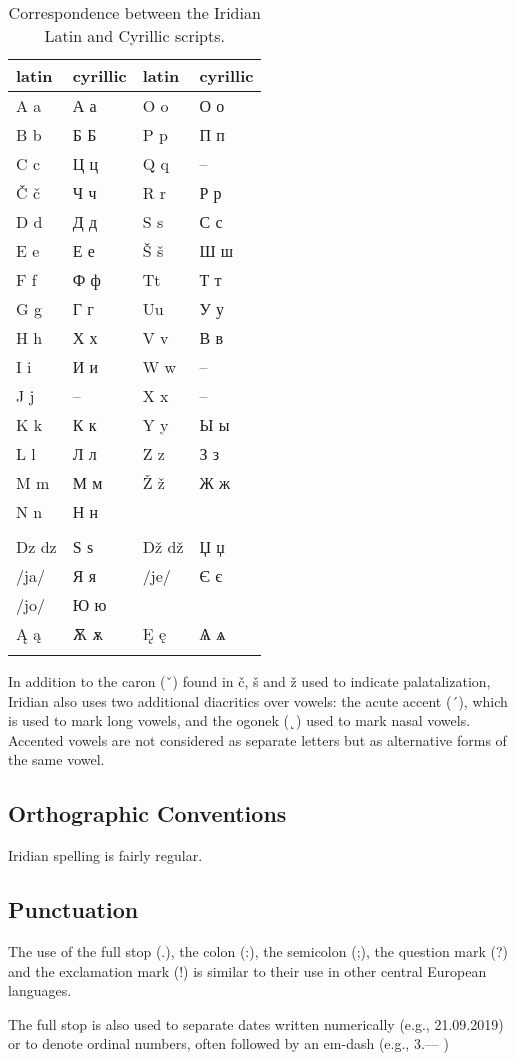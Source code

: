 \begin{table}[h]
	\small
 	\caption{Correspondence between the Iridian Latin and Cyrillic scripts.}
	\medskip
	\begin{tabu}to 0.8 \textwidth {YYYY}
		\toprule
		{{\sc  latin}} & {\sc cyrillic} & {{\sc  latin}} & {\sc cyrillic} \\
		\midrule\addlinespace
		A a 		& А а	& O o   & О о \\ 
		B b			& Б Б 	& P p 	& П п \\
		C c 		& Ц ц 	& Q q 	& -- \\
		Č č 		& Ч ч 	& R r 	& Р р \\
		D d 		& Д д	& S s 	& С с \\
		E e 		& Е е 	& Š š 	& Ш ш \\
		F f			& Ф ф	& Tt 	& Т т \\
		G g 		& Г г	& Uu	& У у \\
		H h			& Х х	& V v   & В в\\
		I i			& И и	& W w   & --\\
		J j			& --	& X x   & --\\
		K k			& К к	& Y y   & Ы ы\\
		L l			& Л л   & Z z   & З з\\
		M m 		& М м   & Ž ž   & Ж ж\\
		N n 		& Н н   &&\\\addlinespace
		\\\addlinespace
		Dz dz 		& Ѕ ѕ 	& D\v{z} d\v{z} & Џ џ\\
		/ja/ 		& Я я	&/je/ & Є є\\
		/jo/		& Ю ю   & &\\
		\k{A} \k{a} & Ѫ ѫ&\k{E} \k{e}&Ѧ ѧ\\ \addlinespace
		\bottomrule
	\end{tabu}
\end{table}
 
In addition to the caron (ˇ) found in \v{c}, \v{s} and \v{z} used to indicate palatalization, Iridian also uses two additional diacritics over vowels: the acute accent (´), which is used to mark long vowels, and the ogonek (˛) used to mark nasal vowels. Accented vowels are not considered as separate letters but as alternative forms of the same vowel.

\subsection{Orthographic Conventions}
Iridian spelling is fairly regular.


\subsection{Punctuation}
The use of the full stop (.), the colon (:), the semicolon (;), the question mark (?) and the exclamation mark (!) is similar to their use in other central European languages.

The full stop is also used to separate dates written numerically (e.g., 21.09.2019) or to denote ordinal numbers, often followed by an em-dash (e.g., 3.--- )